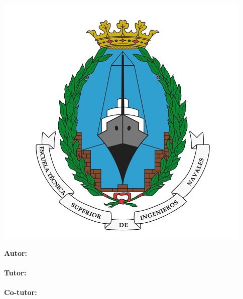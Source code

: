 \begin{titlepage}
		\vfill	
	\begin{minipage}{0.4\textwidth}	 
		\includegraphics[width=1.00 \textwidth]{images/template/ETSIN.jpg} 	
	\end{minipage} \hfill \begin{minipage}{0.4\textwidth}	  
		\textbf{Autor:}\\
		\myauthor \\
		\textbf{Tutor:}\\
		\mytutor \\
		\textbf{Co-tutor:}\\
		\mycotutor \\
		\\[1cm]
		\mydate
	\end{minipage}
\end{titlepage}
\restoregeometry
\clearpage
\shipout\null
